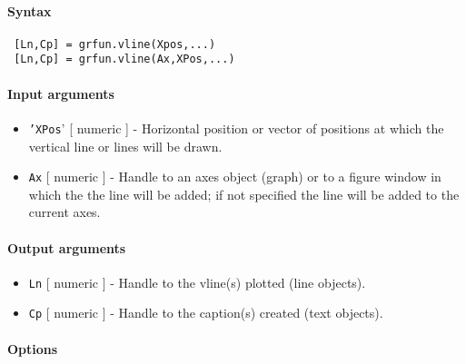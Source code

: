 


	\paragraph{Syntax}
 
 \begin{verbatim}
 [Ln,Cp] = grfun.vline(Xpos,...)
 [Ln,Cp] = grfun.vline(Ax,XPos,...)
 \end{verbatim}
 
 \paragraph{Input arguments}
 
 \begin{itemize}
 \item
   \texttt{'XPos}' {[} numeric {]} - Horizontal position or vector of
   positions at which the vertical line or lines will be drawn.
 \item
   \texttt{Ax} {[} numeric {]} - Handle to an axes object (graph) or to a
   figure window in which the the line will be added; if not specified
   the line will be added to the current axes.
 \end{itemize}
 
 \paragraph{Output arguments}
 
 \begin{itemize}
 \item
   \texttt{Ln} {[} numeric {]} - Handle to the vline(s) plotted (line
   objects).
 \item
   \texttt{Cp} {[} numeric {]} - Handle to the caption(s) created (text
   objects).
 \end{itemize}
 
 \paragraph{Options}
 

